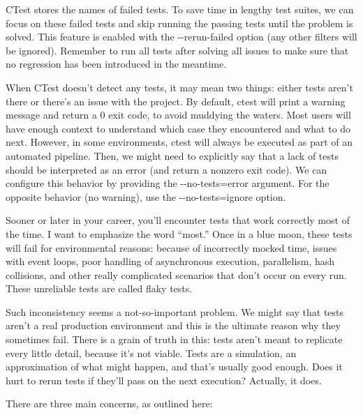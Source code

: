 CTest stores the names of failed tests. To save time in lengthy test suites, we can focus on these failed tests and skip running the passing tests until the problem is solved. This feature is enabled with the -{}-rerun-failed option (any other filters will be ignored). Remember to run all tests after solving all issues to make sure that no regression has been introduced in the meantime.

When CTest doesn’t detect any tests, it may mean two things: either tests aren’t there or there’s an issue with the project. By default, ctest will print a warning message and return a 0 exit code, to avoid muddying the waters. Most users will have enough context to understand which case they encountered and what to do next. However, in some environments, ctest will always be executed as part of an automated pipeline. Then, we might need to explicitly say that a lack of tests should be interpreted as an error (and return a nonzero exit code). We can configure this behavior by providing the -{}-no-tests=error argument. For the opposite behavior (no warning), use the -{}-no-tests=ignore option.


Sooner or later in your career, you’ll encounter tests that work correctly most of the time. I want to emphasize the word “most.” Once in a blue moon, these tests will fail for environmental reasons: because of incorrectly mocked time, issues with event loops, poor handling of asynchronous execution, parallelism, hash collisions, and other really complicated scenarios that don’t occur on every run. These unreliable tests are called flaky tests.

Such inconsistency seems a not-so-important problem. We might say that tests aren’t a real production environment and this is the ultimate reason why they sometimes fail. There is a grain of truth in this: tests aren’t meant to replicate every little detail, because it’s not viable. Tests are a simulation, an approximation of what might happen, and that’s usually good enough. Does it hurt to rerun tests if they’ll pass on the next execution? Actually, it does.

There are three main concerns, as outlined here:

